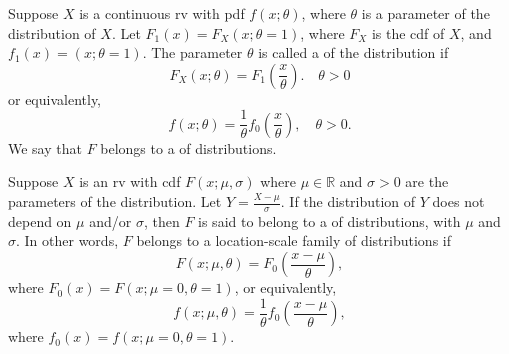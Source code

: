 \documentclass[notoc,notitlepage]{tufte-book}
\begin{document}
\begin{defn}
\label{defn:scale_parameter_and_family}
  Suppose $X$ is a continuous rv with pdf $f(x; \theta)$, where $\theta$ is a parameter of the distribution of $X$. Let $F_1(x) = F_X(x; \theta = 1)$, where $F_X$ is the cdf of $X$, and $f_1(x) = (x; \theta = 1)$. The parameter $\theta$ is called a  of the distribution if
  \begin{equation*}
    F_X( x ; \theta ) = F_1( \frac{x}{\theta} ). \quad \theta > 0
  \end{equation*}
  or equivalently,
  \begin{equation*}
    f(x ; \theta) = \frac{1}{\theta} f_0( \frac{x}{\theta} ), \quad \theta > 0.
  \end{equation*}
  We say that $F$ belongs to a  of distributions.
\end{defn}

\begin{defn}
\label{defn:location_scale_family}
  Suppose $X$ is an rv with cdf $F(x ; \mu, \sigma)$ where $\mu \in \mathbb{R}$ and $\sigma > 0$ are the parameters of the distribution. Let $Y = \frac{X - \mu}{\sigma}$. If the distribution of $Y$ does not depend on $\mu$ and/or $\sigma$, then $F$ is said to belong to a  of distributions, with  $\mu$ and  $\sigma$. In other words, $F$ belongs to a location-scale family of distributions if
  \begin{equation*}
    F(x; \mu, \theta) = F_0 \left( \frac{x - \mu}{\theta} \right),
  \end{equation*}
  where $F_0 (x) = F(x; \mu = 0, \theta = 1)$, or equivalently,
  \begin{equation*}
    f(x; \mu, \theta) = \frac{1}{\theta} f_0 \left( \frac{x - \mu}{\theta} \right),
  \end{equation*}
  where $f_0(x) = f(x; \mu = 0, \theta = 1)$.
\end{defn}
\end{document}
